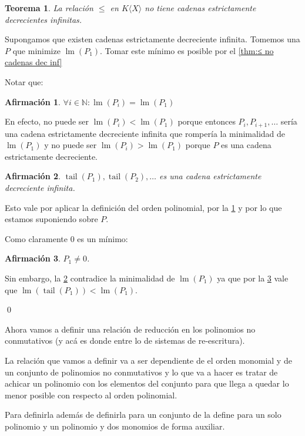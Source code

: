 \documentclass{report}
\theoremstyle{customstyle}
\newtheorem{theorem}{Teorema}[chapter]
\renewenvironment{proof}[1][\proofname]{{\bfseries #1: }}{\qed} %
\theoremstyle{factstyle}
\newtheorem{fact}{Afirmación}[theorem]
\DeclareMathOperator{\lm}{lm}
\DeclareMathOperator{\tail}{tail}
\begin{document}
\begin{theorem}\label{thm:≤ en KX no cadenas dec inf}
  La relación $≤$ en $K⟨X⟩$ no tiene cadenas estrictamente decrecientes infinitas.
\end{theorem}
\begin{proof}
  Supongamos que existen cadenas estrictamente decreciente infinita. Tomemos una $P$ que minimize $\lm(P_1)$. Tomar este mínimo es posible por el \cref{thm:≤ no cadenas dec inf}

  Notar que:

  \begin{fact}\label{fact:≤ en KX no cadenas dec inf:1}
    $∀i ∈ ℕ : \lm(P_i) = \lm(P_1)$
  \end{fact}
  En efecto, no puede ser $\lm(P_i) < \lm(P_1)$ porque entonces $P_i, P_{i + 1}, …$ sería una cadena estrictamente decreciente infinita que rompería la minimalidad de $\lm(P_1)$ y no puede ser $\lm(P_i) > \lm(P_1)$ porque $P$ es una cadena estrictamente decreciente.

  \begin{fact}\label{fact:≤ en KX no cadenas dec inf:2}
    $\tail(P_1), \tail(P_2), …$ es una cadena estrictamente decreciente infinita.
  \end{fact}
  Esto vale por aplicar la definición del orden polinomial, por la \cref{fact:≤ en KX no cadenas dec inf:1} y por lo que estamos suponiendo sobre $P$.

  Como claramente $0$ es un mínimo:

  \begin{fact}\label{fact:≤ en KX no cadenas dec inf:3}
    $P_1 ≠ 0$.
  \end{fact}

  Sin embargo, la \cref{fact:≤ en KX no cadenas dec inf:2} contradice la minimalidad de $\lm(P_1)$ ya que por la \cref{fact:≤ en KX no cadenas dec inf:3} vale que $\lm(\tail(P_1)) < \lm(P_1)$.

\end{proof}

Ahora vamos a definir una relación de reducción en los polinomios no conmutativos (y acá es donde entre lo de sistemas de re-escritura).

La relación que vamos a definir va a ser dependiente de el orden monomial y de un conjunto de polinomios no conmutativos y lo que va a hacer es tratar de achicar un polinomio con los elementos del conjunto para que llega a quedar lo menor posible con respecto al orden polinomial.

Para definirla además de definirla para un conjunto de la define para un solo polinomio y un polinomio y dos monomios de forma auxiliar.
\end{document}

